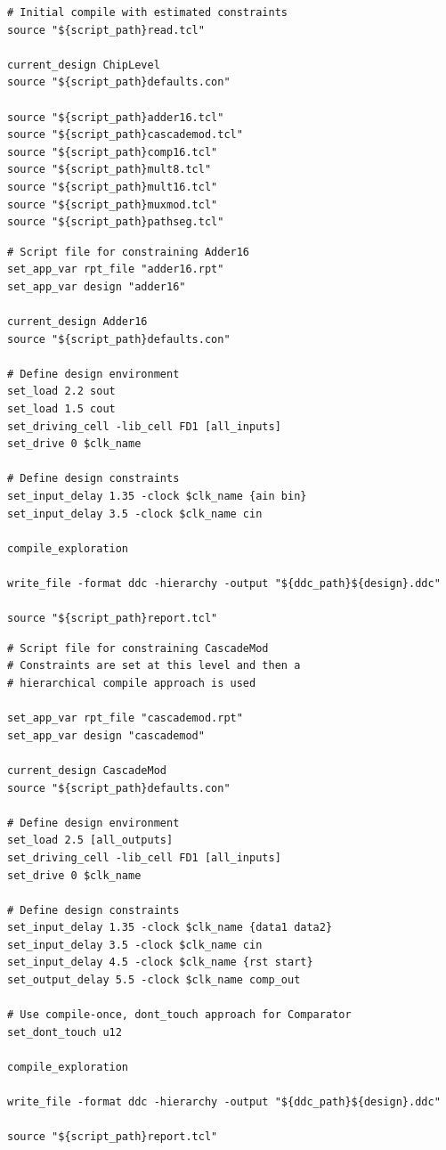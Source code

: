 \begin{lstlisting}[caption={initial\_compile.tcl},label=ex:init-compile]
# Initial compile with estimated constraints
source "${script_path}read.tcl"

current_design ChipLevel
source "${script_path}defaults.con"

source "${script_path}adder16.tcl"
source "${script_path}cascademod.tcl"
source "${script_path}comp16.tcl"
source "${script_path}mult8.tcl"
source "${script_path}mult16.tcl"
source "${script_path}muxmod.tcl"
source "${script_path}pathseg.tcl"
\end{lstlisting}

\begin{lstlisting}[caption={adder16.tcl},label=ex:adder16-tcl]
# Script file for constraining Adder16
set_app_var rpt_file "adder16.rpt"
set_app_var design "adder16"

current_design Adder16
source "${script_path}defaults.con"

# Define design environment
set_load 2.2 sout
set_load 1.5 cout
set_driving_cell -lib_cell FD1 [all_inputs]
set_drive 0 $clk_name

# Define design constraints
set_input_delay 1.35 -clock $clk_name {ain bin}
set_input_delay 3.5 -clock $clk_name cin

compile_exploration

write_file -format ddc -hierarchy -output "${ddc_path}${design}.ddc"

source "${script_path}report.tcl"
\end{lstlisting}

\begin{lstlisting}[caption={cascademod.tcl},label=ex:cascademod-tcl]
# Script file for constraining CascadeMod
# Constraints are set at this level and then a
# hierarchical compile approach is used

set_app_var rpt_file "cascademod.rpt"
set_app_var design "cascademod"

current_design CascadeMod
source "${script_path}defaults.con"

# Define design environment
set_load 2.5 [all_outputs]
set_driving_cell -lib_cell FD1 [all_inputs]
set_drive 0 $clk_name

# Define design constraints
set_input_delay 1.35 -clock $clk_name {data1 data2}
set_input_delay 3.5 -clock $clk_name cin
set_input_delay 4.5 -clock $clk_name {rst start}
set_output_delay 5.5 -clock $clk_name comp_out

# Use compile-once, dont_touch approach for Comparator
set_dont_touch u12

compile_exploration

write_file -format ddc -hierarchy -output "${ddc_path}${design}.ddc"

source "${script_path}report.tcl"
\end{lstlisting}

